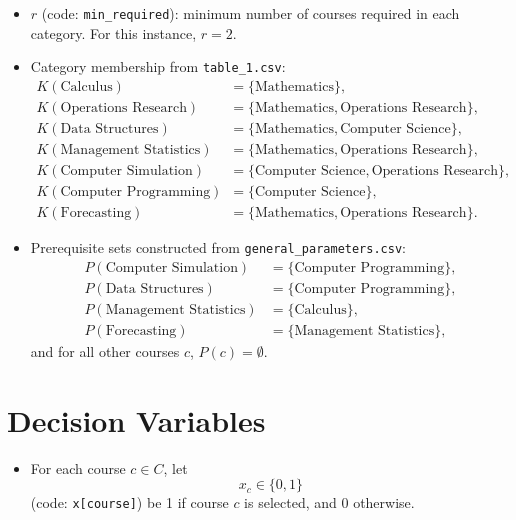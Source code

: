 \begin{itemize}
    \item $r$ (code: \texttt{min\_required}): minimum number of courses required in each category. For this instance, $r=2$.
    \item Category membership from \texttt{table\_1.csv}:
    \[
    \begin{aligned}
    K(\text{Calculus}) &= \{\text{Mathematics}\},\\
    K(\text{Operations Research}) &= \{\text{Mathematics},\text{Operations Research}\},\\
    K(\text{Data Structures}) &= \{\text{Mathematics},\text{Computer Science}\},\\
    K(\text{Management Statistics}) &= \{\text{Mathematics},\text{Operations Research}\},\\
    K(\text{Computer Simulation}) &= \{\text{Computer Science},\text{Operations Research}\},\\
    K(\text{Computer Programming}) &= \{\text{Computer Science}\},\\
    K(\text{Forecasting}) &= \{\text{Mathematics},\text{Operations Research}\}.
    \end{aligned}
    \]
    \item Prerequisite sets constructed from \texttt{general\_parameters.csv}:
    \[
    \begin{aligned}
    P(\text{Computer Simulation}) &= \{\text{Computer Programming}\},\\
    P(\text{Data Structures}) &= \{\text{Computer Programming}\},\\
    P(\text{Management Statistics}) &= \{\text{Calculus}\},\\
    P(\text{Forecasting}) &= \{\text{Management Statistics}\},
    \end{aligned}
    \]
    and for all other courses $c$, $P(c)=\emptyset$.
\end{itemize}

\section*{Decision Variables}

\begin{itemize}
    \item For each course $c \in C$, let
    \[
    x_c \in \{0,1\}
    \]
    (code: \texttt{x[course]}) be 1 if course $c$ is selected, and 0 otherwise.
\end{itemize}

